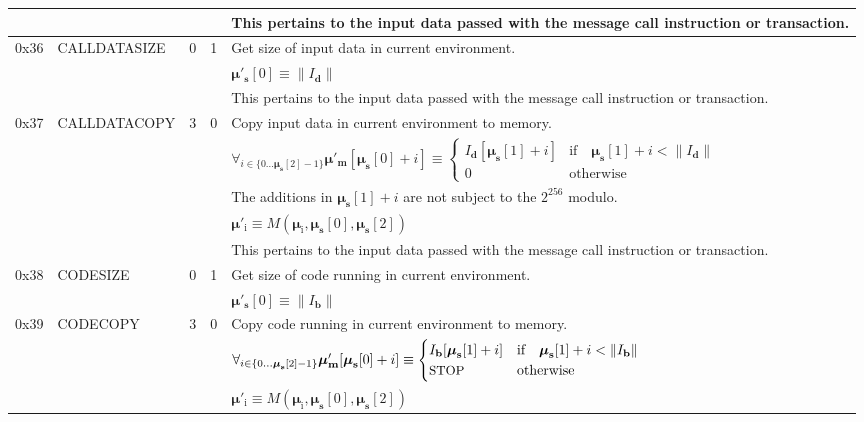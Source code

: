 \documentclass[9pt,oneside]{amsart}
\begin{document}
\begin{tabular*}{\columnwidth}[h]{rlrrl}
&&&& This pertains to the input data passed with the message call instruction or transaction. \\
\midrule
0x36 & {\small CALLDATASIZE} & 0 & 1 & Get size of input data in current environment. \\
&&&& $\boldsymbol{\mu}'_{\mathbf{s}}[0] \equiv \lVert I_{\mathbf{d}} \rVert$ \\
&&&& This pertains to the input data passed with the message call instruction or transaction. \\
\midrule
0x37 & {\small CALLDATACOPY} & 3 & 0 & Copy input data in current environment to memory. \\
&&&& $\forall_{i \in \{ 0 \dots \boldsymbol{\mu}_{\mathbf{s}}[2] - 1\} } \boldsymbol{\mu}'_{\mathbf{m}}[\boldsymbol{\mu}_{\mathbf{s}}[0] + i ] \equiv
\begin{cases} I_{\mathbf{d}}[\boldsymbol{\mu}_{\mathbf{s}}[1] + i] & \text{if} \quad \boldsymbol{\mu}_{\mathbf{s}}[1] + i < \lVert I_{\mathbf{d}} \rVert \\ 0 & \text{otherwise} \end{cases}$\\
&&&& The additions in $\boldsymbol{\mu}_{\mathbf{s}}[1] + i$ are not subject to the $2^{256}$ modulo. \\
&&&& $\boldsymbol{\mu}'_{\mathrm{i}} \equiv M(\boldsymbol{\mu}_{\mathrm{i}}, \boldsymbol{\mu}_{\mathbf{s}}[0], \boldsymbol{\mu}_{\mathbf{s}}[2])$ \\
&&&& This pertains to the input data passed with the message call instruction or transaction. \\
\midrule
0x38 & {\small CODESIZE} & 0 & 1 & Get size of code running in current environment. \\
&&&& $\boldsymbol{\mu}'_{\mathbf{s}}[0] \equiv \lVert I_{\mathbf{b}} \rVert$ \\
\midrule
0x39 & {\small CODECOPY} & 3 & 0 & Copy code running in current environment to memory. \\
&&&& $\forall_{i \in \{ 0 \dots \boldsymbol{\mu}_{\mathbf{s}}[2] - 1\} } \boldsymbol{\mu}'_{\mathbf{m}}[\boldsymbol{\mu}_{\mathbf{s}}[0] + i ] \equiv
\begin{cases} I_{\mathbf{b}}[\boldsymbol{\mu}_{\mathbf{s}}[1] + i] & \text{if} \quad \boldsymbol{\mu}_{\mathbf{s}}[1] + i < \lVert I_{\mathbf{b}} \rVert \\ \text{\small STOP} & \text{otherwise} \end{cases}$\\
&&&& $\boldsymbol{\mu}'_{\mathrm{i}} \equiv M(\boldsymbol{\mu}_{\mathrm{i}}, \boldsymbol{\mu}_{\mathbf{s}}[0], \boldsymbol{\mu}_{\mathbf{s}}[2])$ \\

\end{tabular*}
\end{document}
